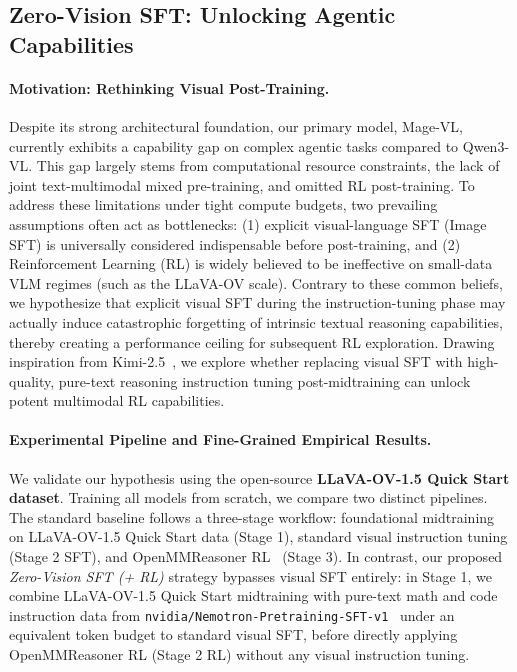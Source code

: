 

\subsection{Zero-Vision SFT: Unlocking Agentic Capabilities}
\label{subsec:zero_vision_sft}

\paragraph{Motivation: Rethinking Visual Post-Training.}
Despite its strong architectural foundation, our primary model, Mage-VL, currently exhibits a capability gap on complex agentic tasks compared to Qwen3-VL. This gap largely stems from computational resource constraints, the lack of joint text-multimodal mixed pre-training, and omitted RL post-training. To address these limitations under tight compute budgets, two prevailing assumptions often act as bottlenecks: (1) explicit visual-language SFT (Image SFT) is universally considered indispensable before post-training, and (2) Reinforcement Learning (RL) is widely believed to be ineffective on small-data VLM regimes (such as the LLaVA-OV scale). Contrary to these common beliefs, we hypothesize that explicit visual SFT during the instruction-tuning phase may actually induce catastrophic forgetting of intrinsic textual reasoning capabilities, thereby creating a performance ceiling for subsequent RL exploration. Drawing inspiration from Kimi-2.5~\cite{team2026kimi}, we explore whether replacing visual SFT with high-quality, pure-text reasoning instruction tuning post-midtraining can unlock potent multimodal RL capabilities.

\paragraph{Experimental Pipeline and Fine-Grained Empirical Results.}
We validate our hypothesis using the open-source \textbf{LLaVA-OV-1.5 Quick Start dataset}. Training all models from scratch, we compare two distinct pipelines. The standard baseline follows a three-stage workflow: foundational midtraining on LLaVA-OV-1.5 Quick Start data (Stage 1), standard visual instruction tuning (Stage 2 SFT), and OpenMMReasoner RL~\cite{zhang2026openmmreasoner} (Stage 3). In contrast, our proposed \textit{Zero-Vision SFT (+ RL)} strategy bypasses visual SFT entirely: in Stage 1, we combine LLaVA-OV-1.5 Quick Start midtraining with pure-text math and code instruction data from \texttt{nvidia/Nemotron-Pretraining-SFT-v1}~\cite{nvidia_nemotron_pretraining_sft_v1} under an equivalent token budget to standard visual SFT, before directly applying OpenMMReasoner RL (Stage 2 RL) without any visual instruction tuning.




